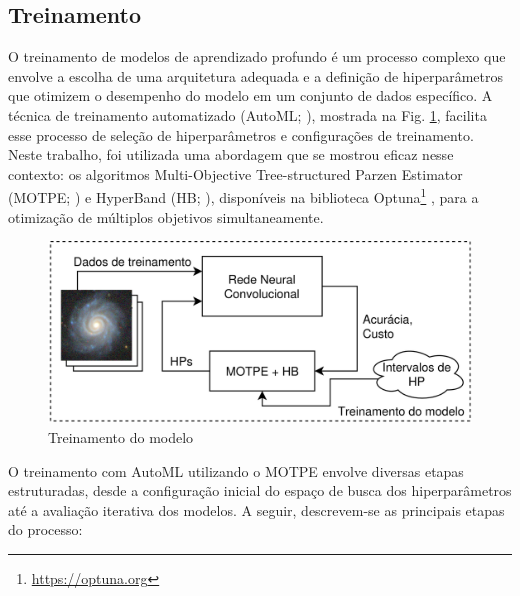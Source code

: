 \subsection{Treinamento}
\label{sec:modelo-treinamento}

O treinamento de modelos de aprendizado profundo é um processo complexo que envolve a escolha de uma arquitetura adequada e a definição de hiperparâmetros que otimizem o desempenho do modelo em um conjunto de dados específico. A técnica de treinamento automatizado (AutoML; \citealp{automl}), mostrada na Fig. \ref{fig:treinamento}, facilita esse processo de seleção de hiperparâmetros e configurações de treinamento. Neste trabalho, foi utilizada uma abordagem que se mostrou eficaz nesse contexto: os algoritmos Multi-Objective Tree-structured Parzen Estimator (MOTPE; \citealp{motpe}) e HyperBand (HB; \citealp{hyperband}), disponíveis na biblioteca Optuna\footnote{\url{https://optuna.org}} \cite{optuna}, para a otimização de múltiplos objetivos simultaneamente.

\begin{figure}[!ht]
  \centering
  \caption{Treinamento do modelo}
  \label{fig:treinamento}
  \includegraphics[width=\linewidth]{figures/treinamento.png}
\end{figure}

O treinamento com AutoML utilizando o MOTPE envolve diversas etapas estruturadas, desde a configuração inicial do espaço de busca dos hiperparâmetros até a avaliação iterativa dos modelos. A seguir, descrevem-se as principais etapas do processo:

